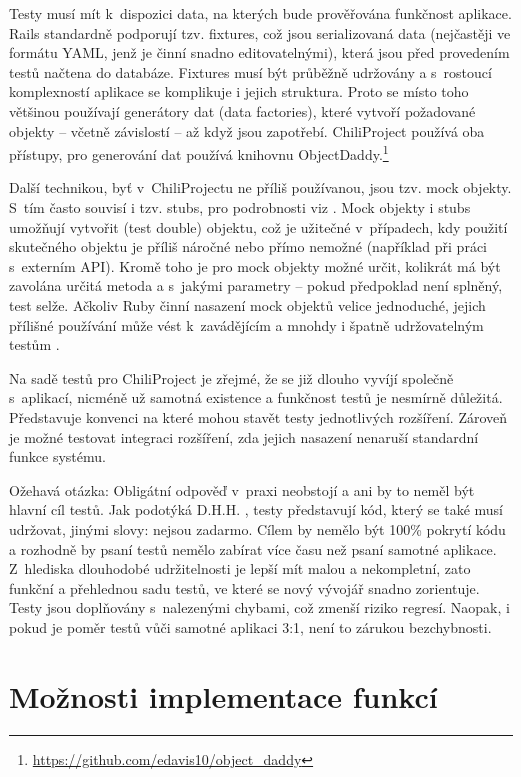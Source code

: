 \documentclass[thesis=B,czech]{FITthesis}[2012/05/02]
\begin{document}
Testy musí mít k~dispozici data, na kterých bude prověřována
funkčnost aplikace. Rails standardně podporují tzv. fixtures, což jsou
serializovaná data (nejčastěji ve formátu \gls{YAML}, jenž je činní
snadno editovatelnými), která jsou před provedením testů načtena do
databáze. Fixtures musí být průběžně udržovány a s~rostoucí komplexností
aplikace se komplikuje i jejich struktura. Proto se místo toho většinou
používají generátory dat (data factories), které vytvoří požadované
objekty -- včetně závislostí -- až když jsou zapotřebí. ChiliProject
používá oba přístupy, pro generování dat používá knihovnu
ObjectDaddy.\footnote{\url{https://github.com/edavis10/object_daddy}}

Další technikou, byť v~ChiliProjectu ne příliš používanou, jsou tzv.
mock objekty. S~tím často souvisí i tzv. stubs, pro podrobnosti viz
\citep{FowlerMocks}. Mock objekty i stubs umožňují vytvořit
 (test double) objektu, což je užitečné
v~případech, kdy použití skutečného objektu je příliš náročné nebo přímo
nemožné (například při práci s~externím API). Kromě toho je pro
mock objekty možné určit, kolikrát má být zavolána určitá metoda a
s~jakými parametry -- pokud předpoklad není splněný, test selže. Ačkoliv
Ruby činní nasazení mock objektů velice jednoduché, jejich přílišné
používání může vést k~zavádějícím a mnohdy i špatně udržovatelným testům
\citep{Parsons2011}.

Na sadě testů pro ChiliProject je zřejmé, že se již dlouho vyvíjí
společně s~aplikací, nicméně už samotná existence a funkčnost testů je
nesmírně důležitá. Představuje konvenci na které mohou stavět testy
jednotlivých rozšíření. Zároveň je možné testovat integraci rozšíření,
zda jejich nasazení nenaruší standardní funkce systému.

Ožehavá otázka:  Obligátní odpověď 
v~praxi neobstojí a ani by to neměl být hlavní cíl testů. Jak podotýká
D.H.H. \citep{HanssonTestingTSA}, testy představují kód, který se
také musí udržovat, jinými slovy: nejsou zadarmo. Cílem by nemělo být
100\% pokrytí kódu a rozhodně by psaní testů nemělo zabírat více času
než psaní samotné aplikace. Z~hlediska dlouhodobé udržitelnosti je lepší
mít malou a nekompletní, zato funkční a přehlednou sadu testů, ve které
se nový vývojář snadno zorientuje. Testy jsou doplňovány s~nalezenými
chybami, což zmenší riziko regresí. Naopak, i pokud je poměr testů vůči
samotné aplikaci 3:1, není to zárukou bezchybnosti.

\section{Možnosti implementace funkcí}
\end{document}
